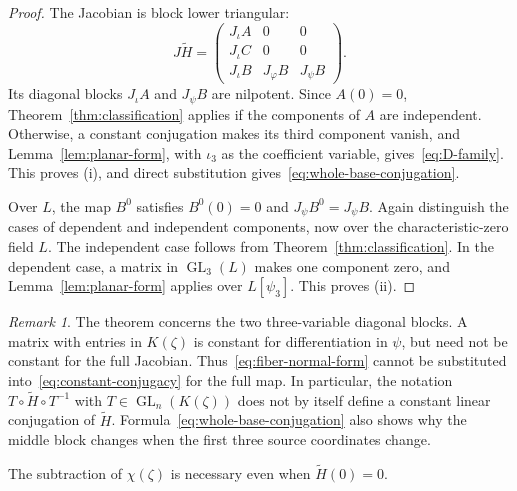 \documentclass[11pt,reqno]{amsart}
\theoremstyle{definition}
\theoremstyle{remark}
\newtheorem{remark}[theorem]{Remark}
\numberwithin{equation}{section}
\DeclareMathOperator{\GL}{GL}
\begin{document}
\begin{proof}
The Jacobian is block lower triangular:
\begin{equation}\label{eq:block-jacobian}
 J\widetilde H=
 \begin{pmatrix}
 J_\iota A&0&0\\
 J_\iota C&0&0\\
 J_\iota B&J_\varphi B&J_\psi B
 \end{pmatrix}.
\end{equation}
Its diagonal blocks $J_\iota A$ and $J_\psi B$ are nilpotent. Since $A(0)=0$, Theorem~\ref{thm:classification} applies if the components of $A$ are independent. Otherwise, a constant conjugation makes its third component vanish, and Lemma~\ref{lem:planar-form}, with $\iota_3$ as the coefficient variable, gives~\eqref{eq:D-family}. This proves (i), and direct substitution gives~\eqref{eq:whole-base-conjugation}.

Over $L$, the map $B^0$ satisfies $B^0(0)=0$ and $J_\psi B^0=J_\psi B$. Again distinguish the cases of dependent and independent components, now over the characteristic-zero field $L$. The independent case follows from Theorem~\ref{thm:classification}. In the dependent case, a matrix in $\GL_3(L)$ makes one component zero, and Lemma~\ref{lem:planar-form} applies over $L[\psi_3]$. This proves (ii).
\end{proof}

\begin{remark}\label{rem:block-interpretation}
The theorem concerns the two three-variable diagonal blocks. A matrix with entries in $K(\zeta)$ is constant for differentiation in $\psi$, but need not be constant for the full Jacobian. Thus~\eqref{eq:fiber-normal-form} cannot be substituted into~\eqref{eq:constant-conjugacy} for the full map. In particular, the notation $T\circ\widetilde H\circ T^{-1}$ with $T\in\GL_n(K(\zeta))$ does not by itself define a constant linear conjugation of $\widetilde H$. Formula~\eqref{eq:whole-base-conjugation} also shows why the middle block changes when the first three source coordinates change.
\end{remark}

The subtraction of $\chi(\zeta)$ is necessary even when $\widetilde H(0)=0$.
\end{document}
